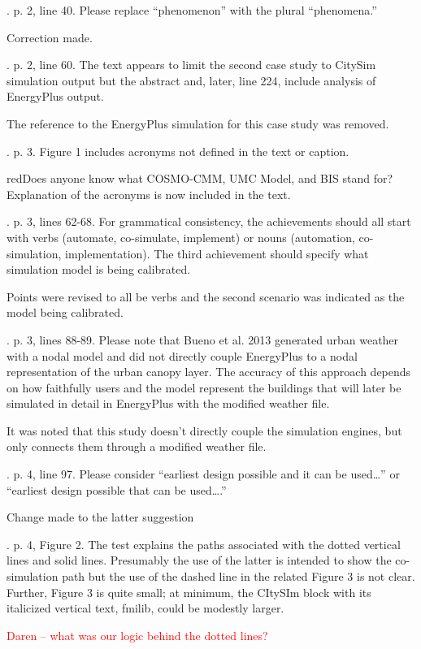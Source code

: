 \documentclass[answers,12pt]{exam}
\begin{document}
\begin{questions}
. p. 2, line 40.  Please replace “phenomenon” with the plural “phenomena.” 
\begin{solution}
Correction made.
\end{solution}

. p. 2, line 60.  The text appears to limit the second case study to CitySim simulation output but the abstract and, later, line 224, include analysis of EnergyPlus output. 
\begin{solution}
The reference to the EnergyPlus simulation for this case study was removed.
\end{solution}

. p. 3.  Figure 1 includes acronyms not defined in the text or caption. 
\begin{solution}
{red}{Does anyone know what COSMO-CMM, UMC Model, and BIS stand for?} 
Explanation of the acronyms is now included in the text.
\end{solution}

. p. 3, lines 62-68.  For grammatical consistency, the achievements should all start with verbs (automate, co-simulate, implement) or nouns (automation, co-simulation, implementation).  The third achievement should specify what simulation model is being calibrated. 
\begin{solution}
Points were revised to all be verbs and the second scenario was indicated as the model being calibrated.
\end{solution}

. p. 3, lines 88-89.  Please note that Bueno et al. 2013 generated urban weather with a nodal model and did not directly couple EnergyPlus to a nodal representation of the urban canopy layer.  The accuracy of this approach depends on how faithfully users and the model represent the buildings that will later be simulated in detail in EnergyPlus with the modified weather file. 
\begin{solution}
It was noted that this study doesn't directly couple the simulation engines, but only connects them through a modified weather file.
\end{solution}

. p. 4, line 97.  Please consider “earliest design possible and it can be used…” or “earliest design possible that can be used….” 
\begin{solution}
Change made to the latter suggestion
\end{solution}

. p. 4, Figure 2. The test explains the paths associated with the dotted vertical lines and solid lines.  Presumably the use of the latter is intended to show the co-simulation path but the use of the dashed line in the related Figure 3 is not clear.  Further, Figure 3 is quite small; at minimum, the CItySIm block with its italicized vertical text, fmilib, could be modestly larger.  
\begin{solution}
\textcolor{red}{Daren -- what was our logic behind the dotted lines?}
\end{solution}


\end{questions}
\end{document}

